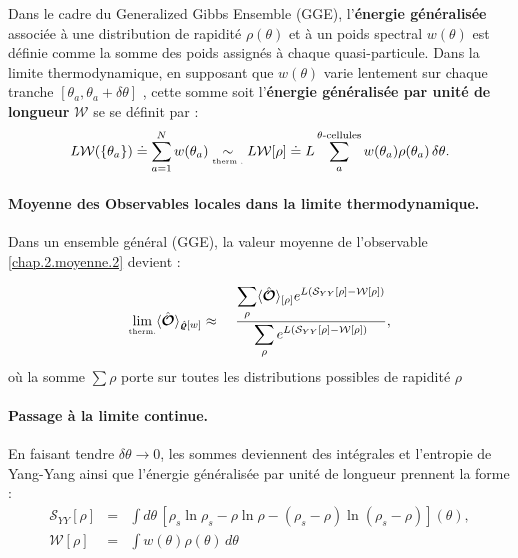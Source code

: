 Dans le cadre du Generalized Gibbs Ensemble (GGE), l’\textbf{énergie généralisée} associée à une distribution de rapidité $\rho(\theta)$ et à un poids spectral $w(\theta)$ est définie comme la somme des poids assignés à chaque quasi-particule. 
Dans la limite thermodynamique, en supposant que $w(\theta)$ varie lentement sur chaque tranche $[\theta_a, \theta_a + \delta\theta]$ ,  cette somme soit l’\textbf{énergie généralisée par unité de longueur} $\mathcal{W}$ se se définit par :
\begin{eqnarray}
	L \mathcal{W}(\{\theta_a\}) \doteq  \sum_{a = 1}^N w(\theta_a) 
	 \underset{\mbox{\tiny therm .}}{\sim}  L \mathcal{W}[\rho]  \doteq  L \sum_a^{\theta\text{-cellules}} w(\theta_a) \rho(\theta_a)\, \delta\theta. 
\end{eqnarray} 


\paragraph{Moyenne des Observables locales dans la limite thermodynamique.}

Dans un ensemble général (GGE), la valeur moyenne de l’observable \eqref{chap.2.moyenne.2} devient :	
	
\begin{eqnarray}\label{chap.2.moyenne.3}
	\underset{\mbox{\tiny therm.}}{\lim} \langle \hat{\bm{\mathcal{O}}} \rangle_{\hat{\bm{\varrho}}[w]} &  \approx &  ~ \frac{  \displaystyle \sum_{\rho }  \langle \hat{\bm{\mathcal{O}}}\rangle_{[\rho]}  e^{L(\mathcal{S}_{YY}[\rho] -  \mathcal{W}[\rho]) }}{ \displaystyle \sum_{\rho } e^{L(\mathcal{S}_{YY}[\rho] -  \mathcal{W}[\rho]) } },
\end{eqnarray}
où la somme $\sum\rho$ porte sur toutes les distributions possibles de rapidité $\rho$

\paragraph{Passage à la limite continue.}
En faisant tendre $\delta\theta \to 0$, les sommes deviennent des intégrales 
et l'entropie de Yang-Yang ainsi que l’énergie généralisée par unité de longueur prennent la forme :
\begin{eqnarray}
	\mathcal{S}_{YY}[\rho] & = & \int d \theta  \, [ \rho_s\ln \rho_s - \rho \ln \rho - ( \rho_s - \rho ) \ln ( \rho_s - \rho ) ] (\theta) , \label{chap.2.entropi.int}\\
	\mathcal{W}[\rho] & = & \int   w(\theta) \rho(\theta) \, d \theta \label{chap.2.W.int}		
\end{eqnarray}

